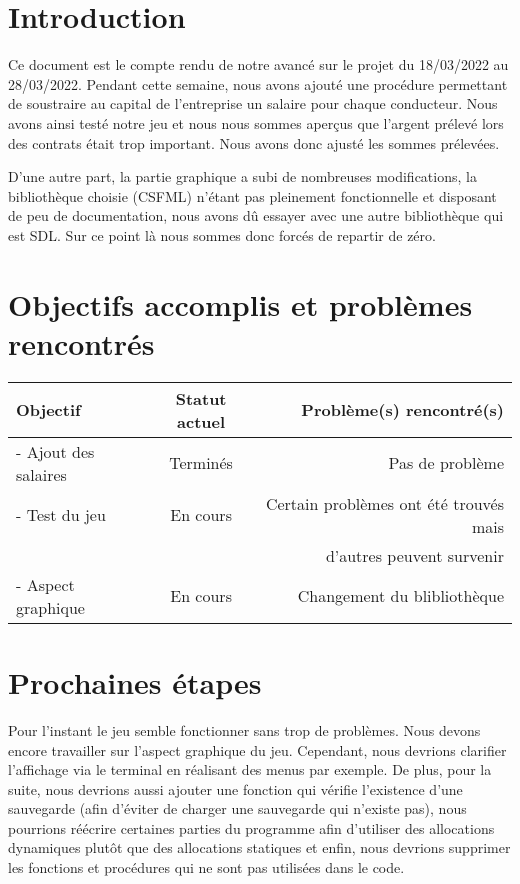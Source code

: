\documentclass[a4paper, 12pt]{article}
\begin{document}
\newpage



\section*{Introduction}
      Ce document est le compte rendu de notre avancé sur le projet du 18/03/2022 au 28/03/2022. Pendant cette semaine, nous avons ajouté une procédure permettant de soustraire au capital de l'entreprise un salaire pour chaque conducteur. Nous avons ainsi testé notre jeu et nous nous sommes aperçus que l'argent prélevé lors des contrats était trop important. Nous avons donc ajusté les sommes prélevées.

      D'une autre part, la partie graphique a subi de nombreuses modifications, la bibliothèque choisie (CSFML) n'étant pas pleinement fonctionnelle et disposant de peu de documentation, nous avons dû essayer avec une autre bibliothèque qui est SDL. Sur ce point là nous sommes donc forcés de repartir de zéro. 

\section{Objectifs accomplis et problèmes rencontrés}
     \begin{tabular}{|l|c|r|}
  \hline
  Objectif & Statut actuel & Problème(s) rencontré(s) \\
  \hline
   - Ajout des salaires & Terminés & Pas de problème \\
   - Test du jeu & En cours & Certain problèmes ont été trouvés mais \\
    &  & d'autres peuvent survenir \\
     - Aspect graphique & En cours & Changement du blibliothèque \\
  
  

  \hline
\end{tabular}
\section{Prochaines étapes}
    Pour l'instant le jeu semble fonctionner sans trop de problèmes. Nous devons encore travailler sur l'aspect graphique du jeu. Cependant, nous devrions clarifier l'affichage via le terminal en réalisant des menus par exemple. De plus, pour la suite, nous devrions aussi ajouter une fonction qui vérifie l'existence d'une sauvegarde (afin d'éviter de charger une sauvegarde qui n'existe pas), nous pourrions réécrire certaines parties du programme afin d'utiliser des allocations dynamiques plutôt que des allocations statiques et enfin, nous devrions supprimer les fonctions et procédures qui ne sont pas utilisées dans le code. 
    
\end{document}
